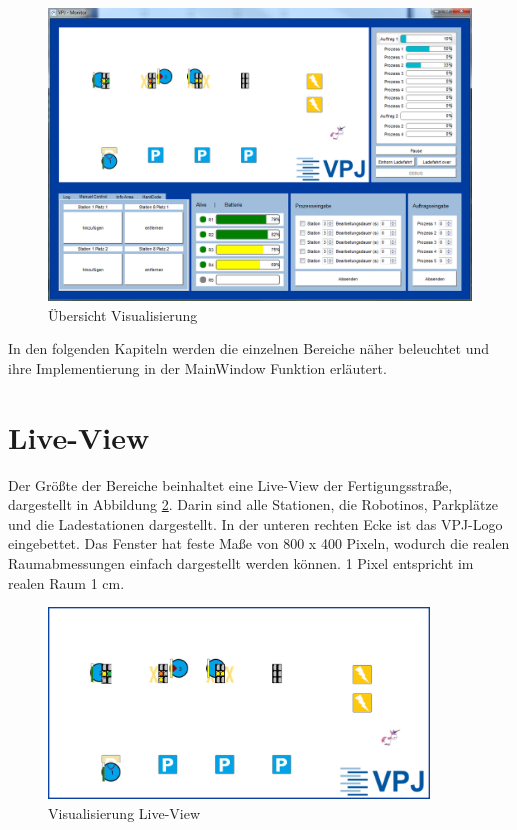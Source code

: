 \begin{figure}[htb]
    \centering
    \includegraphics[width=1\textwidth]{Abbildungen/Gesamtprogramm.png}
    \caption{Übersicht Visualisierung}		
    \label{fig:Gesamtprogramm}
\end{figure}

In den folgenden Kapiteln werden die einzelnen Bereiche näher beleuchtet und ihre Implementierung in der MainWindow Funktion erläutert. 

\section{Live-View}

Der Größte der Bereiche beinhaltet eine Live-View der Fertigungsstraße, dargestellt in Abbildung \ref{fig:LiveView}. Darin sind alle Stationen, die Robotinos, Parkplätze und die Ladestationen dargestellt. In der unteren rechten Ecke ist das VPJ-Logo eingebettet. Das Fenster hat feste Maße von 800 x 400 Pixeln, wodurch die realen Raumabmessungen einfach dargestellt werden können. 1 Pixel entspricht im realen Raum 1 cm. 

\begin{figure}[htb]
    \centering
    \includegraphics[width=0.9\textwidth]{Abbildungen/LiveView.png}
    \caption{Visualisierung Live-View}		
    \label{fig:LiveView}
\end{figure}

